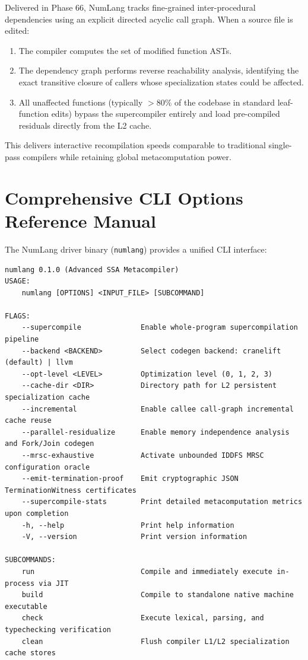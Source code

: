 Delivered in Phase 66, NumLang tracks fine-grained inter-procedural dependencies using an explicit directed acyclic call graph. When a source file is edited:
\begin{enumerate}
    \item The compiler computes the set of modified function ASTs.
    \item The dependency graph performs reverse reachability analysis, identifying the exact transitive closure of callers whose specialization states could be affected.
    \item All unaffected functions (typically $>80\%$ of the codebase in standard leaf-function edits) bypass the supercompiler entirely and load pre-compiled residuals directly from the L2 cache.
\end{enumerate}
This delivers interactive recompilation speeds comparable to traditional single-pass compilers while retaining global metacomputation power.

\section{Comprehensive CLI Options Reference Manual}
\label{sec:arch:cli_manual}

The NumLang driver binary (\texttt{numlang}) provides a unified CLI interface:

\begin{lstlisting}[caption={Command-Line Interface Flags of the NumLang Compiler.}]
numlang 0.1.0 (Advanced SSA Metacompiler)
USAGE:
    numlang [OPTIONS] <INPUT_FILE> [SUBCOMMAND]

FLAGS:
    --supercompile              Enable whole-program supercompilation pipeline
    --backend <BACKEND>         Select codegen backend: cranelift (default) | llvm
    --opt-level <LEVEL>         Optimization level (0, 1, 2, 3)
    --cache-dir <DIR>           Directory path for L2 persistent specialization cache
    --incremental               Enable callee call-graph incremental cache reuse
    --parallel-residualize      Enable memory independence analysis and Fork/Join codegen
    --mrsc-exhaustive           Activate unbounded IDDFS MRSC configuration oracle
    --emit-termination-proof    Emit cryptographic JSON TerminationWitness certificates
    --supercompile-stats        Print detailed metacomputation metrics upon completion
    -h, --help                  Print help information
    -V, --version               Print version information

SUBCOMMANDS:
    run                         Compile and immediately execute in-process via JIT
    build                       Compile to standalone native machine executable
    check                       Execute lexical, parsing, and typechecking verification
    clean                       Flush compiler L1/L2 specialization cache stores
\end{lstlisting}
